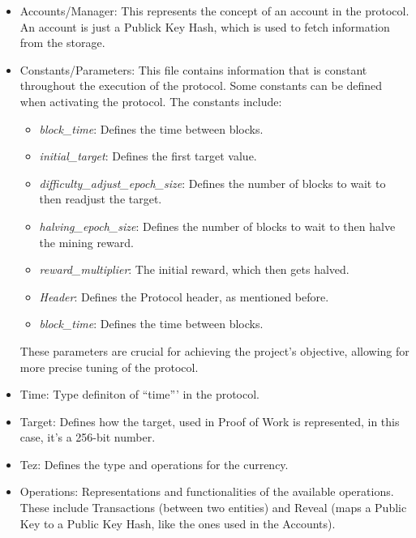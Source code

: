 \begin{itemize}

    \item Accounts/Manager: This represents the concept of an account in the protocol. An account is just a Publick Key Hash, which is used to fetch information from the storage. 

    \item Constants/Parameters: This file contains information that is constant throughout the execution of the protocol. Some constants can be defined when activating the protocol. The constants include:

        \begin{itemize}
            \item \emph{block\_time}: Defines the time between blocks.
            \item \emph{initial\_target}: Defines the first target value.
            \item \emph{difficulty\_adjust\_epoch\_size}: Defines the number of blocks to wait to then readjust the target.
            \item \emph{halving\_epoch\_size}: Defines the number of blocks to wait to then halve the mining reward.
            \item \emph{reward\_multiplier}: The initial reward, which then gets halved.
            \item \emph{Header}: Defines the Protocol header, as mentioned before.
            \item \emph{block\_time}: Defines the time between blocks.
        \end{itemize}
        These parameters are crucial for achieving the project's objective, allowing for more precise tuning of the protocol.

    \item Time: Type definiton of ``time''' in the protocol.

    \item Target: Defines how the target, used in Proof of Work is represented, in this case, it's a 256-bit number.

    \item Tez: Defines the type and operations for the currency.

    \item Operations: Representations and functionalities of the available operations. These include Transactions (between two entities) and Reveal (maps a Public Key to a Public Key Hash, like the ones used in the Accounts).

\end{itemize}

